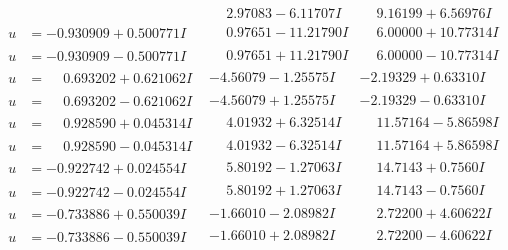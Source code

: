 \documentclass[1p]{elsarticle_modified}
\theoremstyle{definition}
\begin{document}
$$\begin{array}{c|c|c}
 & \phantom{-}2.97083 - 6.11707 I & \phantom{-}9.16199 + 6.56976 I \\ \hline\begin{aligned}
u &= -0.930909 + 0.500771 I\end{aligned}
 & \phantom{-}0.97651 - 11.21790 I & \phantom{-}6.00000 + 10.77314 I \\ \hline\begin{aligned}
u &= -0.930909 - 0.500771 I\end{aligned}
 & \phantom{-}0.97651 + 11.21790 I & \phantom{-}6.00000 - 10.77314 I \\ \hline\begin{aligned}
u &= \phantom{-}0.693202 + 0.621062 I\end{aligned}
 & -4.56079 - 1.25575 I & -2.19329 + 0.63310 I \\ \hline\begin{aligned}
u &= \phantom{-}0.693202 - 0.621062 I\end{aligned}
 & -4.56079 + 1.25575 I & -2.19329 - 0.63310 I \\ \hline\begin{aligned}
u &= \phantom{-}0.928590 + 0.045314 I\end{aligned}
 & \phantom{-}4.01932 + 6.32514 I & \phantom{-}11.57164 - 5.86598 I \\ \hline\begin{aligned}
u &= \phantom{-}0.928590 - 0.045314 I\end{aligned}
 & \phantom{-}4.01932 - 6.32514 I & \phantom{-}11.57164 + 5.86598 I \\ \hline\begin{aligned}
u &= -0.922742 + 0.024554 I\end{aligned}
 & \phantom{-}5.80192 - 1.27063 I & \phantom{-}14.7143 + 0.7560 I \\ \hline\begin{aligned}
u &= -0.922742 - 0.024554 I\end{aligned}
 & \phantom{-}5.80192 + 1.27063 I & \phantom{-}14.7143 - 0.7560 I \\ \hline\begin{aligned}
u &= -0.733886 + 0.550039 I\end{aligned}
 & -1.66010 - 2.08982 I & \phantom{-}2.72200 + 4.60622 I \\ \hline\begin{aligned}
u &= -0.733886 - 0.550039 I\end{aligned}
 & -1.66010 + 2.08982 I & \phantom{-}2.72200 - 4.60622 I \\ \hline\begin{aligned}

\end{aligned}
\end{array}$$
\end{document}
